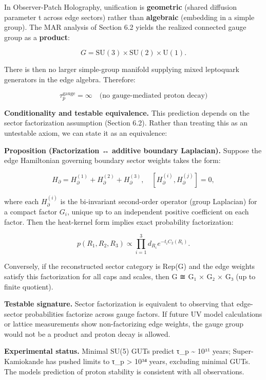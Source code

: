 In Observer-Patch Holography, unification is \textbf{geometric} (shared diffusion parameter t across edge sectors) rather than \textbf{algebraic} (embedding in a simple group). The MAR analysis of Section 6.2 yields the realized connected gauge group as a \textbf{product}:

\[
G = \mathrm{SU}(3) \times \mathrm{SU}(2) \times \mathrm{U}(1).
\]

There is then no larger simple-group manifold supplying mixed leptoquark generators in the edge algebra. Therefore:

\[
\tau_p^{\mathrm{gauge}} = \infty \quad \text{(no gauge-mediated proton decay)}
\]

\textbf{Conditionality and testable equivalence.} This prediction depends on the sector factorization assumption (Section 6.2). Rather than treating this as an untestable axiom, we can state it as an equivalence:

\textbf{Proposition (Factorization ↔ additive boundary Laplacian).} Suppose the edge Hamiltonian governing boundary sector weights takes the form:

\[
H_{\partial} = H^{(1)}_{\partial} + H^{(2)}_{\partial} + H^{(3)}_{\partial},
\quad [H^{(i)}_{\partial}, H^{(j)}_{\partial}] = 0,
\]

where each \(H^{(i)}_{\partial}\) is the bi-invariant second-order operator (group Laplacian) for a compact factor \(G_i\), unique up to an independent positive coefficient on each factor. Then the heat-kernel form implies exact probability factorization:

\[
p(R_1, R_2, R_3) \propto \prod_{i=1}^3 d_{R_i} e^{-t_i C_2(R_i)}.
\]

Conversely, if the reconstructed sector category is Rep(G) and the edge weights satisfy this factorization for all caps and scales, then G ≅ G₁ × G₂ × G₃ (up to finite quotient).

\textbf{Testable signature.} Sector factorization is equivalent to observing that edge-sector probabilities factorize across gauge factors. If future UV model calculations or lattice measurements show non-factorizing edge weights, the gauge group would not be a product and proton decay is allowed.

\textbf{Experimental status.} Minimal SU(5) GUTs predict τ\_p \textasciitilde{} 10³¹ years; Super-Kamiokande has pushed limits to τ\_p \textgreater{} 10³⁴ years, excluding minimal GUTs. The model\textquotesingle s prediction of proton stability is consistent with all observations.

